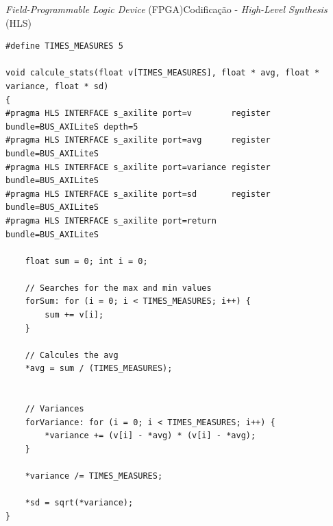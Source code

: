     
    \begin{frame}{\textit{Field-Programmable Logic Device} (FPGA)}{Codificação - \textit{High-Level Synthesis} (HLS)} 
    \vspace{-1em}
    \begin{center}
        \begin{minipage}{10cm}
            \begin{verbatim}
#define TIMES_MEASURES 5

void calcule_stats(float v[TIMES_MEASURES], float * avg, float * variance, float * sd)
{
#pragma HLS INTERFACE s_axilite port=v        register bundle=BUS_AXILiteS depth=5
#pragma HLS INTERFACE s_axilite port=avg      register bundle=BUS_AXILiteS
#pragma HLS INTERFACE s_axilite port=variance register bundle=BUS_AXILiteS
#pragma HLS INTERFACE s_axilite port=sd       register bundle=BUS_AXILiteS
#pragma HLS INTERFACE s_axilite port=return            bundle=BUS_AXILiteS

    float sum = 0; int i = 0;
    
    // Searches for the max and min values
    forSum: for (i = 0; i < TIMES_MEASURES; i++) {
        sum += v[i];
    }
    
    // Calcules the avg
    *avg = sum / (TIMES_MEASURES);
    
    
    // Variances
    forVariance: for (i = 0; i < TIMES_MEASURES; i++) {
        *variance += (v[i] - *avg) * (v[i] - *avg);
    }
    
    *variance /= TIMES_MEASURES;
    
    *sd = sqrt(*variance);
}
            \end{verbatim}
        \end{minipage}
    \end{center}
\end{frame}
    
